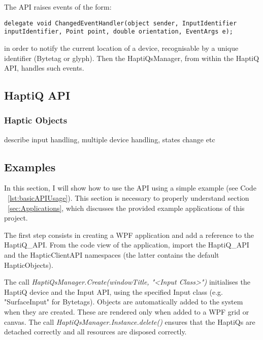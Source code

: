 The API raises events of the form:
\lstset{style=sharpc1}
\begin{lstlisting}
delegate void ChangedEventHandler(object sender, InputIdentifier inputIdentifier, Point point, double orientation, EventArgs e);
\end{lstlisting}

in order to notify the current location of a device, recognisable by a unique identifier (Bytetag or glyph). Then the HaptiQsManager, from within the HaptiQ API, handles such events.  

\subsection{HaptiQ API}


\subsubsection{Haptic Objects}

describe input handling, multiple device handling, states change etc

\subsection{Examples}

In this section, I will show how to use the API using a simple example (see Code ~\ref{lst:basicAPIUsage}). This section is necessary to properly understand section ~\ref{sec:Applications}, which discusses the provided example applications of this project.

The first step consists in creating a WPF application and add a reference to the HaptiQ\_API. From the code view of the application, import the HaptiQ\_API and the HapticClientAPI namespaces (the latter contains the default HapticObjects). 

The call \textit{HaptiQsManager.Create(windowTitle, "\textless Input Class\textgreater")} initialises the HaptiQ device and the Input API, using the specified Input class (e.g. "SurfaceInput" for Bytetags). 
Objects are automatically added to the system when they are created. These are rendered only when added to a WPF grid or canvas. 
The call \textit{HaptiQsManager.Instance.delete()} ensures that the HaptiQs are detached correctly and all resources are disposed correctly.

